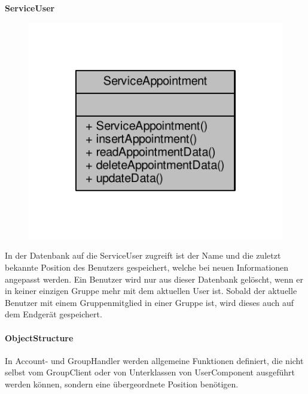 \textbf{ServiceUser}
\begin{figure}[H]
	\includegraphics[scale = 1]{res/umlClasses/service_appointment__coll__graph.pdf}
	\centering
\end{figure}
In der Datenbank auf die ServiceUser zugreift ist der Name und die zuletzt bekannte Position des Benutzers gespeichert, welche bei neuen Informationen angepasst werden. 
Ein Benutzer wird nur aus dieser Datenbank gelöscht, wenn er in keiner einzigen Gruppe mehr mit dem aktuellen User ist.
Sobald der aktuelle Benutzer mit einem Gruppenmitglied in einer Gruppe ist, wird dieses auch auf dem Endgerät gespeichert.


\paragraph{ObjectStructure}

In Account- und GroupHandler werden allgemeine Funktionen definiert, die nicht selbst vom GroupClient oder von Unterklassen von UserComponent ausgeführt werden können, sondern eine übergeordnete Position benötigen.

